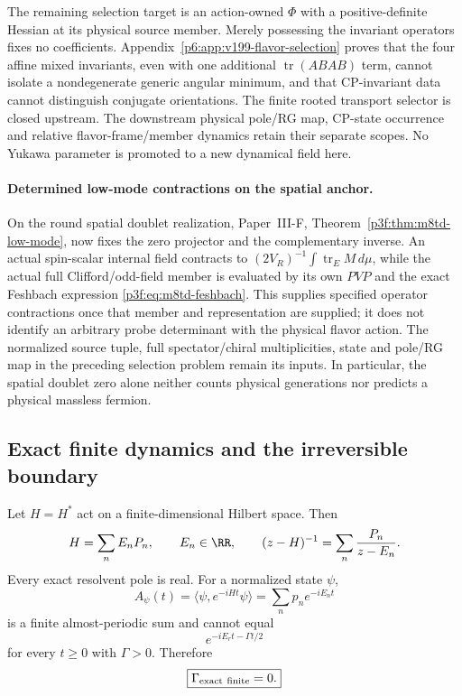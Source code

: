 \documentclass[12pt,a4paper]{article}
\begin{document}
The remaining selection target is an action-owned \(\Phi\) with a
positive-definite Hessian at its physical source member.  Merely possessing
the invariant operators fixes no coefficients.  Appendix~\ref{p6:app:v199-flavor-selection}
proves that the four affine mixed invariants, even with one additional
\(\operatorname{tr}(ABAB)\) term, cannot isolate a nondegenerate generic
angular minimum, and that CP-invariant data cannot distinguish conjugate
orientations.  The finite rooted transport selector is closed upstream.  The downstream physical pole/RG map, CP-state occurrence and relative flavor-frame/member dynamics retain their separate scopes.  No Yukawa parameter is promoted to a new dynamical field here.

\paragraph{Determined low-mode contractions on the spatial anchor.}
\label{p6:par:m8td-flavor-handoff}
On the round spatial doublet realization, Paper~III-F,
Theorem~\ref{p3f:thm:m8td-low-mode}, now fixes the zero projector and
the complementary inverse. An actual spin-scalar internal field contracts
to $(2V_R)^{-1}\int\operatorname{tr}_E M\,d\mu$, while the actual full
Clifford/odd-field member is evaluated by its own $PVP$ and the exact
Feshbach expression \eqref{p3f:eq:m8td-feshbach}. This supplies specified
operator contractions once that member and representation are supplied;
it does not identify an arbitrary probe determinant with the physical
flavor action. The normalized source tuple, full spectator/chiral
multiplicities, state and pole/RG map in the preceding selection problem
remain its inputs. In particular, the spatial doublet zero alone neither
counts physical generations nor predicts a physical massless fermion.

\subsection{Exact finite dynamics and the irreversible boundary}
\label{p6:sec:no-width}

\begin{theorem}
\label{p6:thm:finite-hermitian-no-width}
Let \(H=H^*\) act on a finite-dimensional Hilbert space.  Then
\[
H=\sum_nE_nP_n,\qquad E_n\in\RR,
\qquad
(z-H)^{-1}=\sum_n\frac{P_n}{z-E_n}.
\]
Every exact resolvent pole is real.  For a normalized state \(\psi\),
\[
A_\psi(t)
=
\langle\psi,e^{-iHt}\psi\rangle
=
\sum_np_ne^{-iE_nt}
\]
is a finite almost-periodic sum and cannot equal
\[
e^{-iE_rt-\Gamma t/2}
\]
for every \(t\ge0\) with \(\Gamma>0\).  Therefore
\[
\boxed{\Gamma_{\rm exact\ finite}=0.}
\]
\end{theorem}
\end{document}
